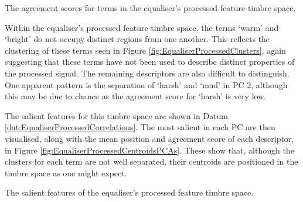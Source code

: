 			\begin{table}[h!]
				\centering
				
				\caption{The agreement scores for terms in the 
					 equaliser's processed feature timbre space.}
				\label{tab:EqualiserProcessedAgreements}
			\end{table}

			Within the equaliser's processed feature timbre space, the terms `warm' and `bright' do not occupy
			distinct regions from one another. This reflects the clustering of these terms seen in Figure
			\ref{fig:EqualiserProcessedClusters}, again suggesting that these terms have not been used to
			describe distinct properties of the processed signal. The remaining descriptors are also difficult
			to distinguish. One apparent pattern is the separation of `harsh' and `mud' in PC 2, although this
			may be due to chance as the agreement score for `harsh' is very low.

			The salient features for this timbre space are shown in Datum
			\ref{dat:EqualiserProcessedCorrelations}. The most salient in each PC are then visualised, along
			with the mean position and agreement score of each descriptor, in Figure
			\ref{fig:EqualiserProcessedCentroidsPCAs}. These show that, although the clusters for each term are
			not well separated, their centroids are positioned in the timbre space as one might expect.

			\begin{datum}[h!]
				\centering
				\begin{minipage}{0.9\textwidth}
					
				\end{minipage}
				\caption{The salient features of the equaliser's
					 processed feature timbre space.}
				\label{dat:EqualiserProcessedCorrelations}
			\end{datum}

